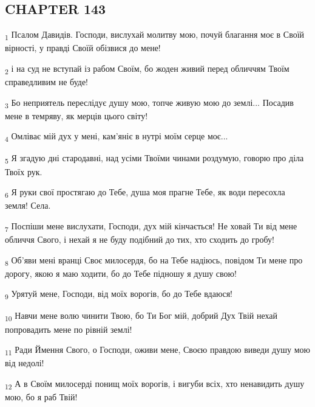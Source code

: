 \subsection{CHAPTER 143}
\begin{tcolorbox}
\textsubscript{1} Псалом Давидів. Господи, вислухай молитву мою, почуй благання моє в Своїй вірності, у правді Своїй обізвися до мене!
\end{tcolorbox}
\begin{tcolorbox}
\textsubscript{2} і на суд не вступай із рабом Своїм, бо жоден живий перед обличчям Твоїм справедливим не буде!
\end{tcolorbox}
\begin{tcolorbox}
\textsubscript{3} Бо неприятель переслідує душу мою, топче живую мою до землі... Посадив мене в темряву, як мерців цього світу!
\end{tcolorbox}
\begin{tcolorbox}
\textsubscript{4} Омліває мій дух у мені, кам'яніє в нутрі моїм серце моє...
\end{tcolorbox}
\begin{tcolorbox}
\textsubscript{5} Я згадую дні стародавні, над усіми Твоїми чинами роздумую, говорю про діла Твоїх рук.
\end{tcolorbox}
\begin{tcolorbox}
\textsubscript{6} Я руки свої простягаю до Тебе, душа моя прагне Тебе, як води пересохла земля! Села.
\end{tcolorbox}
\begin{tcolorbox}
\textsubscript{7} Поспіши мене вислухати, Господи, дух мій кінчається! Не ховай Ти від мене обличчя Свого, і нехай я не буду подібний до тих, хто сходить до гробу!
\end{tcolorbox}
\begin{tcolorbox}
\textsubscript{8} Об'яви мені вранці Своє милосердя, бо на Тебе надіюсь, повідом Ти мене про дорогу, якою я маю ходити, бо до Тебе підношу я душу свою!
\end{tcolorbox}
\begin{tcolorbox}
\textsubscript{9} Урятуй мене, Господи, від моїх ворогів, бо до Тебе вдаюся!
\end{tcolorbox}
\begin{tcolorbox}
\textsubscript{10} Навчи мене волю чинити Твою, бо Ти Бог мій, добрий Дух Твій нехай попровадить мене по рівній землі!
\end{tcolorbox}
\begin{tcolorbox}
\textsubscript{11} Ради Ймення Свого, о Господи, оживи мене, Своєю правдою виведи душу мою від недолі!
\end{tcolorbox}
\begin{tcolorbox}
\textsubscript{12} А в Своїм милосерді понищ моїх ворогів, і вигуби всіх, хто ненавидить душу мою, бо я раб Твій!
\end{tcolorbox}
